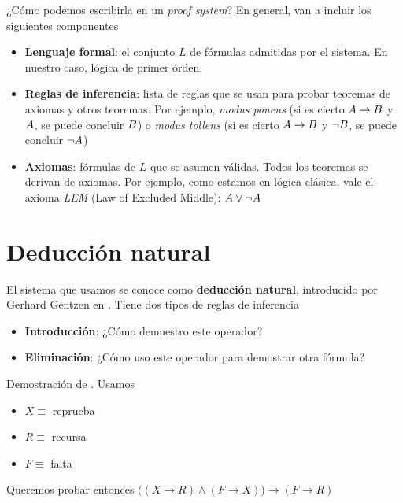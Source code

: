¿Cómo podemos escribirla en un \textit{proof system}? En general, van a incluir
los siguientes componentes

\begin{itemize}
    \item \textbf{Lenguaje formal}: el conjunto $L$ de fórmulas admitidas por
    el sistema. En nuestro caso, lógica de primer órden.
    \item \textbf{Reglas de inferencia}: lista de reglas que se usan para probar
    teoremas de axiomas y otros teoremas. Por ejemplo, \textit{modus ponens} (si
    es cierto $A \rightarrow B$ y $A$, se puede concluir $B$) o
    \textit{modus tollens} (si es cierto $A \rightarrow B$ y $\neg
    B$, se puede concluir $\neg A$)
    \item \textbf{Axiomas}: fórmulas de $L$ que se asumen válidas. Todos los
    teoremas se derivan de axiomas. Por ejemplo, como estamos en lógica clásica,
    vale el axioma \textit{LEM} (Law of Excluded Middle): $A \vee \neg A$
\end{itemize}

\section{Deducción natural}

El sistema que usamos se conoce como \textbf{deducción natural}, introducido por
Gerhard Gentzen en \cite{gentzen-1935} . Tiene dos tipos de
reglas de inferencia

\begin{itemize}
    \item \textbf{Introducción}: ¿Cómo demuestro este operador?
    \item \textbf{Eliminación}: ¿Cómo uso este operador para demostrar otra fórmula?
\end{itemize}

\begin{ejemplo}
    Demostración de . Usamos
    \begin{itemize}
        \item $X \equiv$ reprueba
        \item $R \equiv$ recursa
        \item $F \equiv$ falta
    \end{itemize}

    Queremos probar entonces 
    \(
        \Big(
            (X \rightarrow R) \wedge (F \rightarrow X)
        \Big)
        \rightarrow
        (F \rightarrow R)
    \)
\end{ejemplo}

